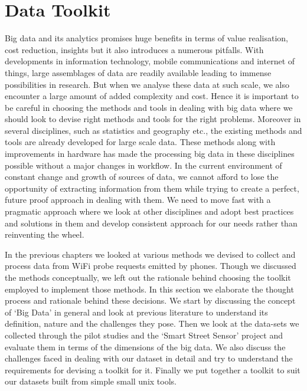 
\section{Data Toolkit}

Big data and its analytics promises huge benefits in terms of value realisation, cost reduction, insights but it also introduces a numerous pitfalls.
With developments in information technology, mobile communications and internet of things, large assemblages of data are readily available leading to immense possibilities in research.
But when we analyse these data at such scale, we also encounter a large amount of added complexity and cost.
Hence it is important to be careful in choosing the methods and tools in dealing with big data where we should look to devise right methods and tools for the right problems.
Moreover in several disciplines, such as statistics and geography etc., the existing methods and tools are already developed for large scale data.
These methods along with improvements in hardware has made the processing big data in these disciplines possible without a major changes in workflow.
In the current environment of constant change and growth of sources of data, we cannot afford to lose the opportunity of extracting information from them while trying to create a perfect, future proof approach in dealing with them.
We need to move fast with a pragmatic approach where we look at other disciplines and adopt best practices and solutions in them and develop consistent approach for our needs rather than reinventing the wheel.

In the previous chapters we looked at various methods we devised to collect and process data from WiFi probe requests emitted by phones.
Though we discussed the methods conceptually, we left out the rationale behind choosing the toolkit employed to implement those methods.
In this section we elaborate the thought process and rationale behind these decisions.
We start by discussing the concept of `Big Data' in general and look at previous literature to understand its definition, nature and the challenges they pose.
Then we look at the data-sets we collected through the pilot studies and the `Smart Street Sensor' project and evaluate them in terms of the dimensions of the big data.
We also discuss the challenges faced in dealing with our dataset in detail and try to understand the requirements for devising a toolkit for it.
Finally we put together a toolkit to suit our datasets built from simple small unix tools.

